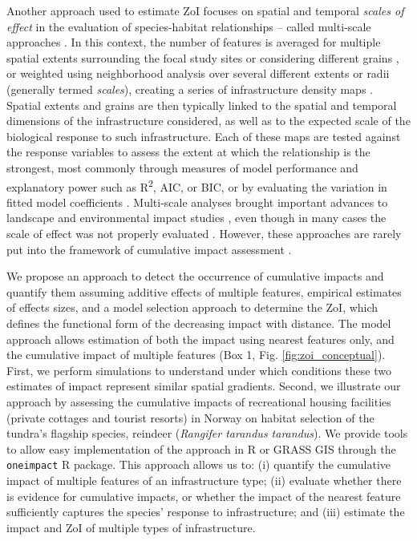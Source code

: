 \documentclass[titlepage]{article}
\begin{document}
Another approach used to estimate ZoI focuses on spatial and temporal \textit{scales of effect} in the evaluation of species-habitat relationships -- called multi-scale approaches \citep[e.g.][]{zeller_multi-level_2017}. In this context, the number of features is averaged for multiple spatial extents surrounding the focal study sites \citep{jackson_are_2015} or considering different grains \citep{laforge_process-focussed_2015}, or weighted using neighborhood analysis over several different extents or radii (generally termed \textit{scales}), creating a series of infrastructure density maps \citep{mcgarigal_multi-scale_2016}. Spatial extents and grains are then typically linked to the spatial and temporal dimensions of the infrastructure considered, as well as to the expected scale of the biological response to such infrastructure. Each of these maps are tested against the response variables to assess the extent at which the relationship is the strongest, most commonly through measures of model performance and explanatory power such as R\textsuperscript{2}, AIC, or BIC, or by evaluating the variation in fitted model coefficients \citep{jackson_are_2015, huais_multifit_2018}.
Multi-scale analyses brought important advances to landscape and environmental impact studies \citep[e.g.][]{mcgarigal_multi-scale_2016}, even though in many cases the scale of effect was not properly evaluated \citep{jackson_are_2015}. However, these approaches are rarely put into the framework of cumulative impact assessment \citep[but see][]{polfus_identifying_2011}.

We propose an approach to detect the occurrence of cumulative impacts and quantify them assuming additive effects of multiple features, empirical estimates of effects sizes, and a model selection approach to determine the ZoI, which defines the functional form of the decreasing impact with distance. The model approach allows estimation of both the impact using nearest features only, and the cumulative impact of multiple features (Box 1, Fig. \ref{fig:zoi_conceptual}). First, we perform simulations to understand under which conditions these two estimates of impact represent similar spatial gradients.
Second, we illustrate our approach by assessing the cumulative impacts of recreational housing facilities (private cottages and tourist resorts) in Norway on habitat selection of the tundra's flagship species, reindeer (\textit{Rangifer tarandus tarandus}). We provide tools to allow easy implementation of the approach in R \citep{r_core_team_r_2020} or GRASS GIS \citep{grass_development_team_geographic_2017} through the \verb|oneimpact| R package. This approach allows us to: (i) quantify the cumulative impact of multiple features of an infrastructure type; (ii) evaluate whether there is evidence for cumulative impacts, or whether the impact of the nearest feature sufficiently captures the species' response to infrastructure; and (iii) estimate the impact and ZoI of multiple types of infrastructure. 
\end{document}
